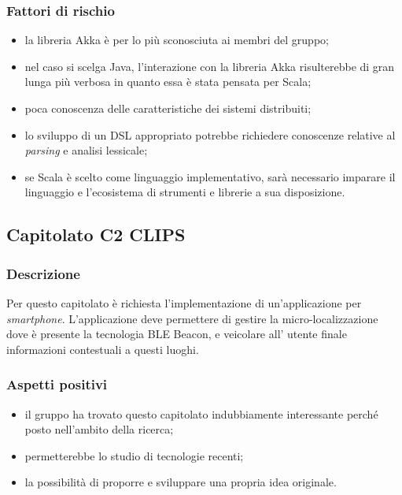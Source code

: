 \documentclass[12pt,a4paper]{article}
\begin{document}
\subsubsection{Fattori di rischio}
\begin{itemize}
\item la libreria Akka è per lo più sconosciuta ai membri del gruppo;
\item nel caso si scelga Java, l'interazione con la libreria Akka risulterebbe di gran lunga più verbosa
in quanto essa è stata pensata per Scala;
\item poca conoscenza delle caratteristiche dei sistemi distribuiti;
\item lo sviluppo di un DSL appropriato potrebbe richiedere conoscenze relative al \textit{parsing} e 
analisi lessicale;
\item se Scala è scelto come linguaggio implementativo, sarà necessario imparare il linguaggio e l'ecosistema
di strumenti e librerie a sua disposizione.
\end{itemize}

\newpage

\subsection{Capitolato C2 CLIPS}

\subsubsection{Descrizione}

Per questo capitolato è richiesta l'implementazione di un'applicazione per \textit{smartphone}. L'applicazione deve permettere di gestire la micro-localizzazione dove è presente la tecnologia BLE Beacon, e veicolare all' utente finale informazioni contestuali a questi luoghi. 

\subsubsection{Aspetti positivi}
\begin{itemize}
 \item il gruppo ha trovato questo capitolato indubbiamente interessante perché posto nell'ambito della ricerca;
 \item permetterebbe lo studio di tecnologie recenti;
 \item la possibilità di proporre e sviluppare una propria idea originale.
\end{itemize}
\end{document}
